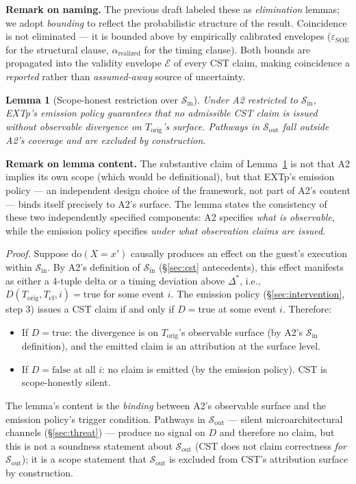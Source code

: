 \documentclass[conference]{IEEEtran}
\newtheorem{lemma}{Lemma}
\newcommand{\Korig}{T_\text{orig}}
\newcommand{\Tcf}{T_\text{cf}}
\newcommand{\Dstar}{\Delta^{*}}
\newcommand{\arealized}{\alpha_\text{realized}}
\newcommand{\dox}[1]{\text{do}(X{=}#1)}
\newcommand{\epsSOE}{\varepsilon_\text{SOE}}
\begin{document}
\textbf{Remark on naming.} The previous draft labeled these as
\emph{elimination} lemmas; we adopt \emph{bounding} to reflect the
probabilistic structure of the result. Coincidence is not
eliminated --- it is bounded above by empirically calibrated
envelopes ($\epsSOE$ for the structural clause, $\arealized$ for
the timing clause). Both bounds are propagated into the validity
envelope $\mathcal{E}$ of every CST claim, making coincidence a
\emph{reported} rather than \emph{assumed-away} source of
uncertainty.

\begin{lemma}[Scope-honest restriction over $\mathcal{S}_\text{in}$]
\label{lem:silent}
Under A2 restricted to $\mathcal{S}_\text{in}$, EXTp's emission
policy guarantees that no admissible CST claim is issued without
observable divergence on $\Korig$'s surface. Pathways in
$\mathcal{S}_\text{out}$ fall outside A2's coverage and are
excluded by construction.
\end{lemma}

\textbf{Remark on lemma content.} The substantive claim of
Lemma~\ref{lem:silent} is not that A2 implies its own scope (which
would be definitional), but that EXTp's emission policy --- an
independent design choice of the framework, not part of A2's
content --- binds itself precisely to A2's surface. The lemma
states the consistency of these two independently specified
components: A2 specifies \emph{what is observable}, while the
emission policy specifies \emph{under what observation claims are
issued}.

\textit{Proof.} Suppose $\dox{x'}$ causally produces an effect on
the guest's execution within $\mathcal{S}_\text{in}$. By A2's
definition of $\mathcal{S}_\text{in}$ (\S\ref{sec:cst}
antecedents), this effect manifests as either a 4-tuple delta or
a timing deviation above $\Dstar$, i.e., $D(\Korig, \Tcf, i) =
\text{true}$ for some event $i$. The emission policy
(\S\ref{sec:intervention}, step 3) issues a CST claim if and only
if $D = \text{true}$ at some event $i$. Therefore:
\begin{itemize}[leftmargin=*]
  \item If $D = \text{true}$: the divergence is on $\Korig$'s
    observable surface (by A2's $\mathcal{S}_\text{in}$
    definition), and the emitted claim is an attribution at the
    surface level.
  \item If $D = \text{false}$ at all $i$: no claim is emitted (by
    the emission policy). CST is scope-honestly silent.
\end{itemize}
The lemma's content is the \emph{binding} between A2's observable
surface and the emission policy's trigger condition. Pathways in
$\mathcal{S}_\text{out}$ --- silent microarchitectural channels
(\S\ref{sec:threat}) --- produce no signal on $D$ and therefore
no claim, but this is not a soundness statement about
$\mathcal{S}_\text{out}$ (CST does not claim correctness
\emph{for} $\mathcal{S}_\text{out}$); it is a scope statement that
$\mathcal{S}_\text{out}$ is excluded from CST's attribution
surface by construction.
\end{document}

